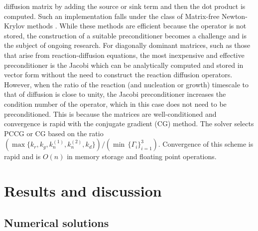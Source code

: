 \documentclass[aps,preprint]{revtex4}
\begin{document}
diffusion matrix by adding the source or sink term and then the dot product is
computed. Such an implementation falls under the class of Matrix-free
Newton-Krylov methods \cite{NewtonKrylov}. While these methods are efficient
because the operator is not stored, the construction of a suitable
preconditioner becomes a challenge and is the subject of ongoing research.
For diagonally dominant matrices, such as those that arise from
reaction-diffusion equations, the most inexpensive and effective
preconditioner is the Jacobi which can be analytically computed and stored in
vector form without the need to construct the reaction diffusion operators.
However, when the ratio of the reaction (and nucleation or growth) timescale
to that of diffusion is close to unity, the Jacobi preconditioner increases
the condition number of the operator, which in this case does not need to be
preconditioned. This is because the matrices are well-conditioned and
convergence is rapid with the conjugate gradient (CG) method. The solver
selects PCCG or CG based on the ratio $\left(  {\max\{k_{r},k_{g},k^{(1)}%
_{n},k_{n}^{(2)},k_{d}\}} \right) / \left( {\min\, \{\Gamma_{i}\}_{i=1}^{3} }
\right) $. Convergence of this scheme is rapid and is $O(n)$ in memory storage
and floating point operations.

\section{Results and discussion}

\subsection{Numerical solutions}
\end{document}
